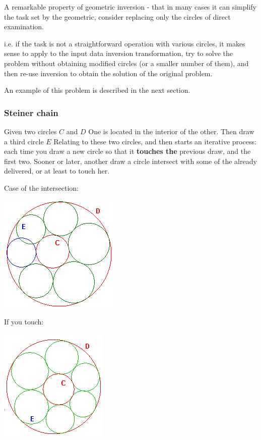 A remarkable property of geometric inversion - that in many cases it can simplify the task set by the geometric, consider replacing only the circles of direct examination.

i.e. if the task is not a straightforward operation with various circles, it makes sense to apply to the input data inversion transformation, try to solve the problem without obtaining modified circles (or a smaller number of them), and then re-use inversion to obtain the solution of the original problem.

An example of this problem is described in the next section.

\subsubsection{ Steiner chain }

Given two circles $C$ and $D$ One is located in the interior of the other. Then draw a third circle $E$ Relating to these two circles, and then starts an iterative process: each time you draw a new circle so that it \textbf{touches the} previous draw, and the first two. Sooner or later, another draw a circle intersect with some of the already delivered, or at least to touch her.

Case of the intersection:

\includegraphics[scale=0.5]{13.png}

If you touch:

\includegraphics[scale=0.5]{14.png}

